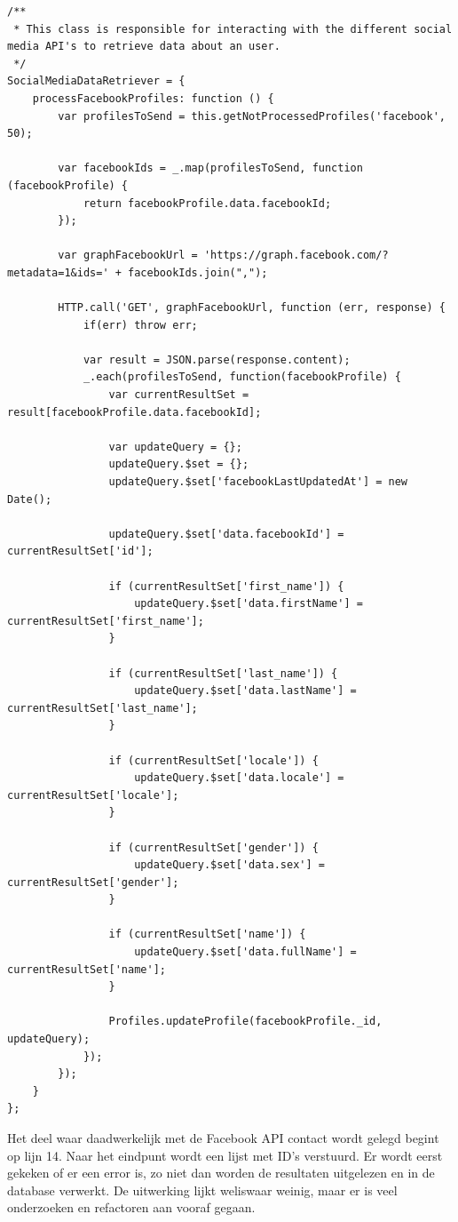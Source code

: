 \begin{lstlisting}[caption=Facebook API interactie]
/**
 * This class is responsible for interacting with the different social media API's to retrieve data about an user.
 */
SocialMediaDataRetriever = {
    processFacebookProfiles: function () {
        var profilesToSend = this.getNotProcessedProfiles('facebook', 50);

        var facebookIds = _.map(profilesToSend, function (facebookProfile) {
            return facebookProfile.data.facebookId;
        });

        var graphFacebookUrl = 'https://graph.facebook.com/?metadata=1&ids=' + facebookIds.join(",");

        HTTP.call('GET', graphFacebookUrl, function (err, response) {
            if(err) throw err;

            var result = JSON.parse(response.content);
            _.each(profilesToSend, function(facebookProfile) {
                var currentResultSet = result[facebookProfile.data.facebookId];

                var updateQuery = {};
                updateQuery.$set = {};
                updateQuery.$set['facebookLastUpdatedAt'] = new Date();

                updateQuery.$set['data.facebookId'] = currentResultSet['id'];

                if (currentResultSet['first_name']) {
                    updateQuery.$set['data.firstName'] = currentResultSet['first_name'];
                }

                if (currentResultSet['last_name']) {
                    updateQuery.$set['data.lastName'] = currentResultSet['last_name'];
                }

                if (currentResultSet['locale']) {
                    updateQuery.$set['data.locale'] = currentResultSet['locale'];
                }

                if (currentResultSet['gender']) {
                    updateQuery.$set['data.sex'] = currentResultSet['gender'];
                }

                if (currentResultSet['name']) {
                    updateQuery.$set['data.fullName'] = currentResultSet['name'];
                }

                Profiles.updateProfile(facebookProfile._id, updateQuery);
            });
        });
    }
};
\end{lstlisting}

Het deel waar daadwerkelijk met de Facebook API contact wordt gelegd begint op lijn 14. Naar het eindpunt wordt een lijst met ID's verstuurd. Er wordt eerst gekeken of er een error is, zo niet dan worden de resultaten uitgelezen en in de database verwerkt. De uitwerking lijkt weliswaar weinig, maar er is veel onderzoeken en refactoren aan vooraf gegaan.

